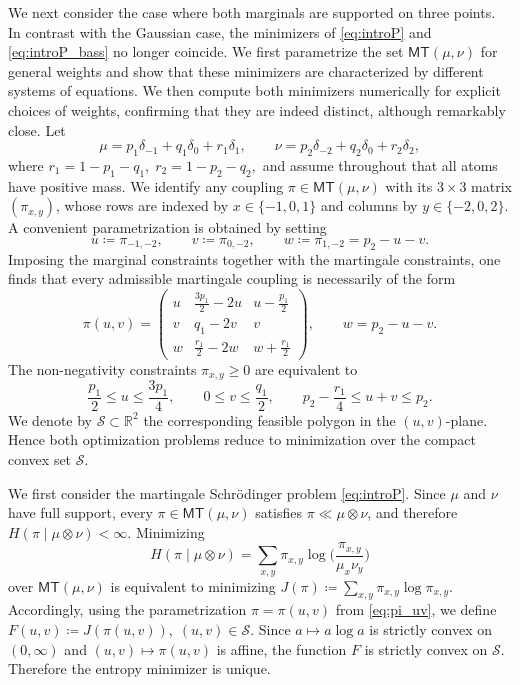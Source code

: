 \documentclass[reqno, a4paper]{amsart}
\theoremstyle{plain}
\theoremstyle{definition}
\theoremstyle{remark}
\numberwithin{equation}{section}
\numberwithin{theorem}{section}
\newcommand{\R}{\mathbb{R}}
\newcommand{\MT}{\mathsf{MT}}
\begin{document}
	We next consider the case where both marginals are supported on three points. In contrast with the Gaussian case, the minimizers of \eqref{eq:introP} and \eqref{eq:introP_bass} no longer coincide. We first parametrize the set $\MT(\mu,\nu)$ for general weights and show that these minimizers are characterized by different systems of equations. We then compute both minimizers numerically for explicit choices of weights, confirming that they are indeed distinct, although remarkably close. Let
	\[
	\mu=p_1\delta_{-1}+q_1\delta_0+r_1\delta_{1},
	\qquad
	\nu=p_2\delta_{-2}+q_2\delta_0+r_2\delta_{2},
	\]
	where
	$
	r_1=1-p_1-q_1,
	\;
	r_2=1-p_2-q_2,
	$
	and assume throughout that all atoms have positive mass. We identify any coupling
	$\pi\in\MT(\mu,\nu)$
	with its $3\times 3$ matrix $(\pi_{x,y})$, whose rows are indexed by
	$x\in\{-1,0,1\}$ and columns by $y\in\{-2,0,2\}$.
	A convenient parametrization is obtained by setting
	\[
	u\coloneq \pi_{-1,-2},
	\qquad
	v\coloneq \pi_{0,-2},
	\qquad
	w\coloneq \pi_{1,-2}=p_2-u-v.
	\]
	Imposing the marginal constraints together with the martingale constraints, one finds that every admissible martingale coupling is necessarily of the form
	\begin{equation}\label{eq:pi_uv}
		\pi(u,v)=
		\begin{pmatrix}
			u & \frac{3p_1}{2}-2u & u-\frac{p_1}{2}\\[4pt]
			v & q_1-2v & v\\[4pt]
			w & \frac{r_1}{2}-2w & w+\frac{r_1}{2}
		\end{pmatrix},
		\qquad
		w=p_2-u-v.
	\end{equation}
	The non-negativity constraints $\pi_{x,y}\ge 0$ are equivalent to
	\[
	\frac{p_1}{2}\le u\le \frac{3p_1}{4},
	\qquad
	0\le v\le \frac{q_1}{2},
	\qquad
	p_2-\frac{r_1}{4}\le u+v\le p_2.
	\]
	We denote by $\mathcal S\subset\R^2$ the corresponding feasible polygon in the $(u,v)$-plane. Hence both optimization problems reduce to minimization over the compact convex set $\mathcal S$.
	
	
	We first consider the martingale Schr\"odinger problem \eqref{eq:introP}. Since $\mu$ and $\nu$ have full support, every $\pi\in\MT(\mu,\nu)$ satisfies $\pi\ll\mu\otimes\nu$, and therefore
	$
	H(\pi\mid \mu\otimes\nu)<\infty.
	$
	Minimizing
	\[
	H(\pi\mid \mu\otimes\nu)
	=
	\sum_{x,y}\pi_{x,y}\log\!\Big(\frac{\pi_{x,y}}{\mu_x\nu_y}\Big)
	\]
	over $\MT(\mu,\nu)$ is equivalent to minimizing
	$
	J(\pi)\coloneq \sum_{x,y}\pi_{x,y}\log \pi_{x,y}.
	$
	Accordingly, using the parametrization $\pi=\pi(u,v)$ from \eqref{eq:pi_uv}, we define
	$
	F(u,v)\coloneq J(\pi(u,v)),
	\; (u,v)\in\mathcal S.
	$
	Since $a\mapsto a\log a$ is strictly convex on $(0,\infty)$ and $(u,v)\mapsto \pi(u,v)$ is affine, the function $F$ is strictly convex on $\mathcal S$. Therefore the entropy minimizer is unique.
	
\end{document}
